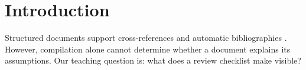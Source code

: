 \section{Introduction}
Structured documents support cross-references and automatic
bibliographies \parencite{lamport1994}. However, compilation alone
cannot determine whether a document explains its assumptions.
Our teaching question is: what does a review checklist make visible?
